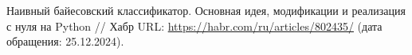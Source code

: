 \begin{thebibliography}{99}
    Наивный байесовский классификатор. Основная идея, модификации и реализация с нуля на Python // 
    Хабр URL: \url{https://habr.com/ru/articles/802435/} (дата обращения: 25.12.2024).
\end{thebibliography}
\pagebreak
